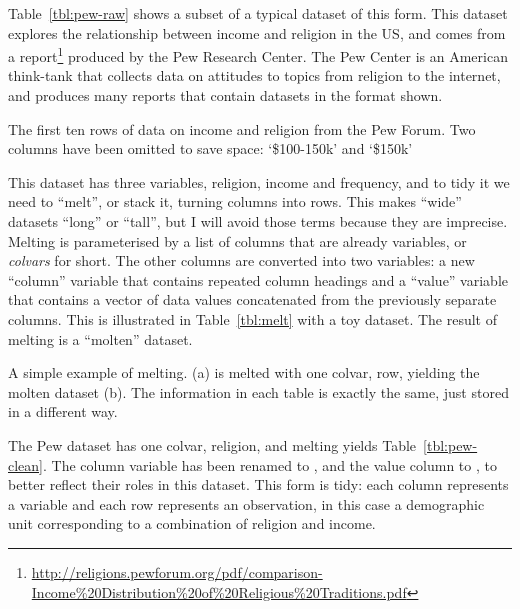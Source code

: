 \documentclass[article]{jss}
\begin{document}
Table~\ref{tbl:pew-raw} shows a subset of a typical dataset of this form. This dataset explores the relationship between income and religion in the US, and comes from a report\footnote{\url{http://religions.pewforum.org/pdf/comparison-Income\%20Distribution\%20of\%20Religious\%20Traditions.pdf}} produced by the Pew Research Center. The Pew Center is an American think-tank that collects data on attitudes to topics from religion to the internet, and produces many reports that contain datasets in the format shown.

\begin{table}[htbp]
  \centering
  
  \caption{The first ten rows of data on income and religion from the Pew Forum. Two columns have been omitted to save space: `\$100-150k' and `\$150k'} 
  \label{tbl:pew-raw}
\end{table}

This dataset has three variables, religion, income and frequency, and to tidy it we need to ``melt'', or stack it, turning columns into rows. This makes ``wide'' datasets ``long'' or ``tall'', but I will avoid those terms because they are imprecise. Melting is parameterised by a list of columns that are already variables, or \emph{colvars} for short. The other columns are converted into two variables: a new ``column'' variable that contains repeated column headings and a ``value'' variable that contains a vector of data values concatenated from the previously separate columns. This is illustrated in Table~\ref{tbl:melt} with a toy dataset. The result of melting is a ``molten'' dataset.

\begin{table}
  \centering
  \hspace{2em}%

  \caption{A simple example of melting. (a) is melted with one colvar, row, yielding the molten dataset (b). The information in each table is exactly the same, just stored in a different way.}
  \label{tbl:melt} 
\end{table}

The Pew dataset has one colvar, religion, and melting yields Table~\ref{tbl:pew-clean}. The column variable has been renamed to , and the value column to , to better reflect their roles in this dataset. This form is tidy: each column represents a variable and each row represents an observation, in this case a demographic unit corresponding to a combination of religion and income.
\end{document}

